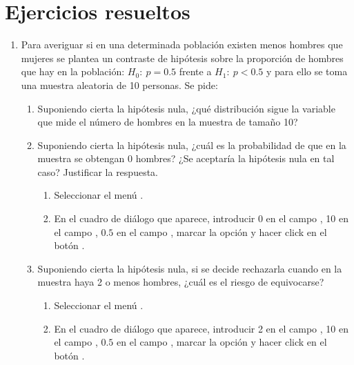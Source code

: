 \clearpage
\newpage

\section{Ejercicios resueltos}
\begin{enumerate}[leftmargin=*]
\item Para averiguar si en una determinada población existen menos hombres que mujeres se plantea un contraste de
hipótesis sobre la proporción de hombres que hay en la población: $H_0:\ p=0.5$ frente a $H_1:\ p<0.5$ y para ello se
toma una muestra aleatoria de 10 personas. 
Se pide:
\begin{enumerate}
\item Suponiendo cierta la hipótesis nula, ¿qué distribución sigue la variable que mide el número de hombres en la
muestra de tamaño 10?
\item Suponiendo cierta la hipótesis nula, ¿cuál es la probabilidad de que en la muestra se obtengan 0 hombres?
¿Se aceptaría la hipótesis nula en tal caso? 
Justificar la respuesta.
\begin{indicacion}{
\begin{enumerate}
\item Seleccionar el menú .
\item En el cuadro de diálogo que aparece, introducir 0 en el campo , 10 en el campo
, $0.5$ en el campo , marcar la opción  y
hacer click en el botón .
\end{enumerate}}
\end{indicacion}

\item Suponiendo cierta la hipótesis nula, si se decide rechazarla cuando en la muestra haya 2 o menos hombres, ¿cuál es
el riesgo de equivocarse?
\begin{indicacion}{
\begin{enumerate}
\item Seleccionar el menú .
\item En el cuadro de diálogo que aparece, introducir 2 en el campo , 10 en el campo
, $0.5$ en el campo , marcar la opción  y
hacer click en el botón .
\end{enumerate}}
\end{indicacion}


\end{enumerate}
\end{enumerate}
